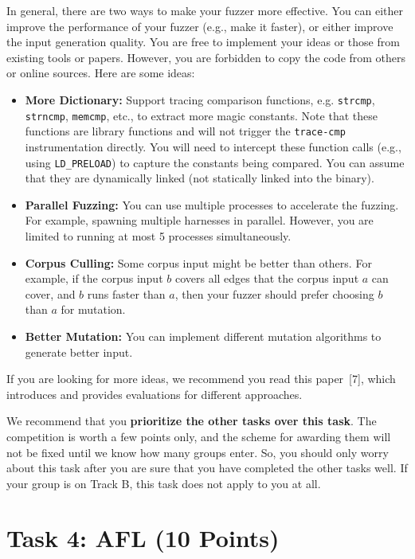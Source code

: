 \documentclass[letterpaper,11pt]{article}
\begin{document}
In general, there are two ways to make your fuzzer more effective.
You can either improve the performance of your fuzzer (e.g., make it faster), or either improve the input generation quality.
You are free to implement your ideas or those from existing tools or papers.
However, you are forbidden to copy the code from others or online sources.
Here are some ideas:
\begin{itemize}
    \item \textbf{More Dictionary:} Support tracing comparison functions, e.g. \texttt{strcmp}, \texttt{strncmp}, \texttt{memcmp}, etc., to extract more magic constants. Note that these functions are library functions and will not trigger the \texttt{trace-cmp} instrumentation directly. You will need to intercept these function calls (e.g., using \texttt{LD\_PRELOAD}) to capture the constants being compared. You can assume that they are dynamically linked (not statically linked into the binary).
    \item \textbf{Parallel Fuzzing:} You can use multiple processes to accelerate the fuzzing. For example, spawning multiple harnesses in parallel. However, you are limited to running at most 5 processes simultaneously.
    \item \textbf{Corpus Culling:} Some corpus input might be better than others. For example, if the corpus input $b$ covers all edges that the corpus input $a$ can cover, and $b$ runs faster than $a$, then your fuzzer should prefer choosing $b$ than $a$ for mutation.
    \item \textbf{Better Mutation:} You can implement different mutation algorithms to generate better input.
\end{itemize}

If you are looking for more ideas, we recommend you read this paper~[7], which introduces and provides evaluations for different approaches.

We recommend that you \textbf{prioritize the other tasks over this task}. The competition is worth a few points only, and the scheme for awarding them will not be fixed until we know how many groups enter. So, you should only worry about this task after you are sure that you have completed the other tasks well. If your group is on Track B, this task does not apply to you at all.


\section{Task 4: AFL (10 Points)}
\end{document}
